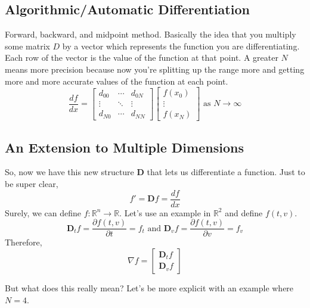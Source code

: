 \documentclass{article}
\begin{document}
\subsection {Algorithmic/Automatic Differentiation}
Forward, backward, and midpoint method.
Basically the idea that you multiply some matrix $D$ by a vector which represents the function you are differentiating. Each row of the vector is the
value of the function at that point. A greater $N$ means more precision because now you're splitting up the range more and getting more and more accurate
values of the function at each point. 
$$
\dfrac{df}{dx} = 
\begin{bmatrix}
	d_{00} & \cdots & d_{0N} \\
	\vdots & \ddots & \vdots \\
	d_{N0} & \cdots & d_{NN}
\end{bmatrix}
\begin{bmatrix}
	f(x_0) \\
	\vdots \\
	f(x_N)
\end{bmatrix}
\text{ as } N \rightarrow \infty
$$

\subsection {An Extension to Multiple Dimensions}
So, now we have this new structure $\mathbf{D}$ that lets us differentiate a function. Just to be super clear, $$f' = \mathbf{D}f = \dfrac{df}{dx}$$
Surely, we can define $f: \mathbb{R}^n \rightarrow \mathbb{R}$. Let's use an example in $\mathbb{R}^2$ and define $f(t, v)$.
$$\mathbf{D}_tf = \dfrac{\partial f(t, v)}{\partial t} = f_t \text{ and } \mathbf{D}_vf = \dfrac{\partial f(t, v)}{\partial v} = f_v$$
Therefore,
$$
\nabla f = \begin{bmatrix}
	\mathbf{D}_tf \\
	\mathbf{D}_vf
\end{bmatrix}
$$

But what does this really mean? Let's be more explicit with an example where $N = 4$.
\end{document}
